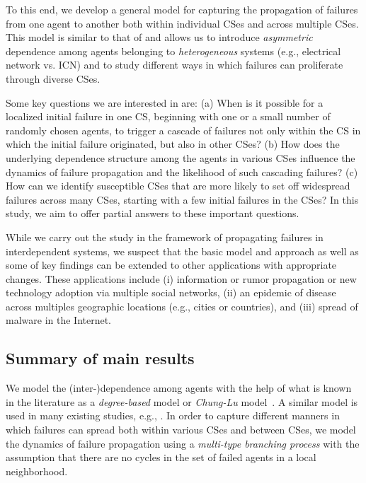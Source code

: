 \documentclass[10pt, journal, compsoc]{IEEEtran}
\begin{document}
To this end, we develop a general model for capturing 
the propagation of failures from one agent to another 
both within individual CSes and across multiple CSes. 
This model is similar to that of \cite{Kham2016}
and allows us to introduce {\em asymmetric} dependence 
among agents belonging to {\em heterogeneous} systems 
(e.g., electrical network vs. 
ICN) and to study different ways in which failures 
can proliferate through diverse CSes.

Some key questions we are interested in are: (a) 
When is it possible for a localized initial failure
in one CS, beginning with one or a small number of 
randomly chosen agents, to trigger a cascade of failures 
not only within the CS in which the initial 
failure originated, but also in other CSes? 
(b) How does the underlying dependence 
structure among the agents in various CSes
influence the dynamics of failure propagation and 
the likelihood of such cascading failures? 
(c) How can we identify susceptible CSes that are more
likely to set off widespread failures across many 
CSes, starting with a few initial failures
in the CSes? In this study, we aim to offer 
partial answers to these important questions. 

While we carry out the study in the framework of
propagating failures in interdependent systems, 
we suspect that the basic model and approach as 
well as some
of key findings can be extended to other 
applications with appropriate changes. 
These applications include (i) information or rumor
propagation or new technology adoption via
multiple social networks, 
(ii) an epidemic of disease across multiples
geographic locations (e.g., cities or countries), 
and (iii) spread of malware in the Internet. 


\subsection{Summary of main results}

We model the (inter-)dependence among agents 
with the help of what is known in the literature 
as a {\em degree-based} model or {\em Chung-Lu} 
model~\cite{ChungLu}. 
A similar model is used in many 
existing studies, e.g., 
\cite{Brummitt2012, Buldyrev2010, La_TON, 
Watts2002, Zhuang2016}. 
In order to capture different manners in which 
failures can spread both within various CSes
and between CSes, we model the dynamics of
failure propagation using a {\em 
multi-type branching process} with the
assumption that there are no cycles in the 
set of failed agents in a local neighborhood. 
\end{document}
